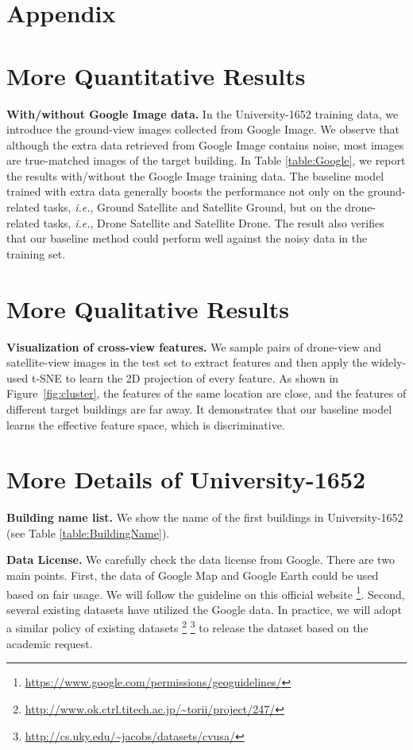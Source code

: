 \documentclass[sigconf]{acmart}
\def\ie{\emph{i.e.}}
\begin{document}
\clearpage
\appendix
\section*{Appendix}
\setcounter{section}{0}
\renewcommand\thesection{\Alph{section}}

\section{More Quantitative Results}



\textbf{With/without Google Image data.} In the University-1652 training data, we introduce the ground-view images collected from Google Image. We observe that although the extra data retrieved from Google Image contains noise, most images are true-matched images of the target building. In Table \ref{table:Google}, we report the results with/without the Google Image training data. The baseline model trained with extra data generally boosts the performance not only on the ground-related tasks, \ie, Ground  Satellite and Satellite  Ground,  but on the drone-related tasks, \ie, Drone  Satellite and Satellite  Drone. The result also verifies that our baseline method could perform well against the noisy data in the training set.


\section{More Qualitative Results}
\textbf{Visualization of cross-view features.} 
We sample  pairs of drone-view and satellite-view images in the test set to extract features and then apply the widely-used t-SNE \cite{van2014accelerating} to learn the 2D projection of every feature. As shown in Figure~\ref{fig:cluster}, the features of the same location are close, and the features of different target buildings are far away. It demonstrates that our baseline model learns the effective feature space, which is discriminative.


\section{More Details of University-1652}

\textbf{Building name list.} We show the name of the first  buildings in University-1652 (see Table \ref{table:BuildingName}). 

\noindent\textbf{Data License.} We carefully check the data license from Google. There are two main points.
First, the data of Google Map and Google Earth could be used based on fair usage. We will follow the guideline on this official website \footnote{\url{https://www.google.com/permissions/geoguidelines/}}.
Second, several existing datasets have utilized the Google data. In practice, we will adopt a similar policy of existing datasets \footnote{\url{http://www.ok.ctrl.titech.ac.jp/~torii/project/247/}} 
\footnote{\url{http://cs.uky.edu/~jacobs/datasets/cvusa/}} to release the dataset based on the academic request. 
\end{document}
